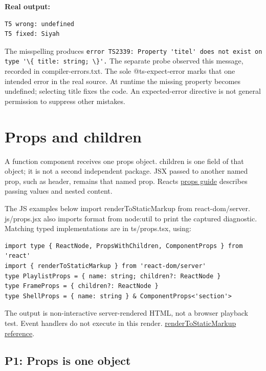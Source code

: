 \documentclass[
  10pt,
  a4paper,
  titlepage]{article}
\newcommand{\passthrough}[1]{#1}
\begin{document}
\textbf{Real output:}

\Needspace{41.2pt}
\begin{lstlisting}
T5 wrong: undefined
T5 fixed: Siyah
\end{lstlisting}

The misspelling produces
\passthrough{\lstinline!error TS2339: Property 'titel' does not exist on type '\{ title: string; \}'.!}
The separate probe observed this message, recorded in
compiler-errors.txt. The sole @ts-expect-error marks that one intended
error in the real source. At runtime the missing property becomes
undefined; selecting title fixes the code. An expected-error directive
is not general permission to suppress other mistakes.

\section{Props and children}\label{props-and-children}

A function component receives one props object. children is one field of
that object; it is not a second independent package. JSX passed to
another named prop, such as header, remains that named prop.
React\textquotesingle s
\href{https://react.dev/learn/passing-props-to-a-component}{props guide}
describes passing values and nested content.

The JS examples below import renderToStaticMarkup from react-dom/server.
js/props.jsx also imports format from node:util to print the captured
diagnostic. Matching typed implementations are in ts/props.tsx, using:

\Needspace{72.1pt}
\begin{lstlisting}[language=TSX]
import type { ReactNode, PropsWithChildren, ComponentProps } from 'react'
import { renderToStaticMarkup } from 'react-dom/server'
type PlaylistProps = { name: string; children?: ReactNode }
type FrameProps = { children?: ReactNode }
type ShellProps = { name: string } & ComponentProps<'section'>
\end{lstlisting}

The output is non-interactive server-rendered HTML, not a browser
playback test. Event handlers do not execute in this render.
\href{https://react.dev/reference/react-dom/server/renderToStaticMarkup}{renderToStaticMarkup
reference}.

\subsection{P1: Props is one object}\label{p1-props-is-one-object}
\end{document}
